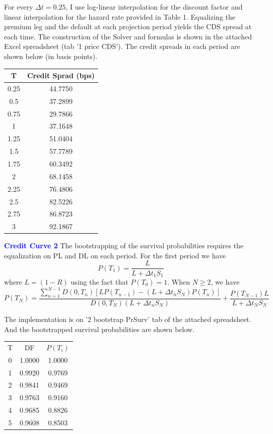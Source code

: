 \documentclass[a4paper,11pt] {article}
\begin{document}
For every $\Delta t= 0.25$, I use log-linear interpolation for the discount factor and linear interpolation for the hazard rate provided in Table 1. Equalizing the premium leg and the default at each projection period yields the CDS spread at each time. The construction of the Solver and formulas is shown in the attached Excel spreadsheet (tab '1 price CDS'). The credit spreads in each period are shown below (in basis points).

\begin{center}
\begin{tabular}{|c|c|}
  \hline
T	&	Credit Sprad (bps)	\\ \hline
0.25	&	44.7750	\\
0.5	&	37.2899	\\
0.75	&	29.7866	\\
1	&	37.1648	\\
1.25	&	51.0404	\\
1.5	&	57.7789	\\
1.75	&	60.3492	\\
2	&	68.1458	\\
2.25	&	76.4806	\\
2.5	&	82.5226 \\
2.75	&	86.8723	\\
3	&	92.1867	\\
  \hline
\end{tabular}
\end{center}

\bigskip

\textcolor{blue}{\bf Credit Curve 2} The bootstrapping of the survival probabilities requires the equalization on PL and DL on each period. For the first period we have
$$
P(T_1) = \frac{L}{L+\Delta t_1 S_1}
$$
where $L=(1-R)$ using the fact that $P(T_0)=1$. When $N\geq 2$, we have
$$
P(T_N)=\frac{\sum_{n=1}^{N-1}D(0,T_n)[LP(T_{n-1})-(L+\Delta t_n S_N)P(T_n)]}{D(0,T_N)(L+\Delta t_n S_N)} + \frac{P(T_{N-1})L}{L+\Delta t_N S_N}
$$

The implementation is on '2 bootstrap PrSurv' tab of the attached spreadsheet. And the bootstrapped survival probabilities are shown below.

\begin{center}
\begin{tabular}{|c|c|c|}
  \hline
T	&	DF	&	$P(T_i)$	\\
0	&	1.0000	&	1.0000	\\
1	&	0.9920	&	0.9769	\\
2	&	0.9841	&	0.9469	\\
3	&	0.9763	&	0.9160	\\
4	&	0.9685	&	0.8826	\\
5	&	0.9608	&	0.8503	\\
  \hline
\end{tabular}
\end{center}
\end{document}
